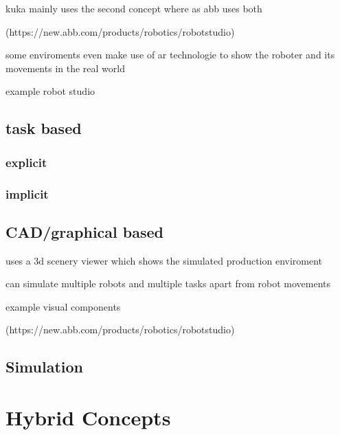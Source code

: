 \documentclass[conference]{IEEEtran}
\begin{document}
        kuka mainly uses the second concept where as abb uses both

        (https://new.abb.com/products/robotics/robotstudio)

        some enviroments even make use of ar technologie to show the roboter and its movements in the real world
        
        example robot studio

    
    \subsection{task based}
        \subsubsection{explicit}
        \subsubsection{implicit}
    \subsection{CAD/graphical based}

        uses a 3d scenery viewer which shows the simulated production enviroment

        can simulate multiple robots and multiple tasks apart from robot movements

        example visual components

        

        

        (https://new.abb.com/products/robotics/robotstudio)

        

    \subsection{Simulation}

\section{Hybrid Concepts}


\end{document}
